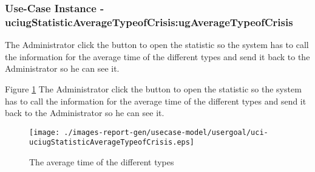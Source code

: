 
	\subsubsection{Use-Case Instance - uciugStatisticAverageTypeofCrisis:ugAverageTypeofCrisis}
	
	The Administrator click the button to open the statistic so the system has to call the information for the average time of the different types and send it back to the Administrator so he can see it. 		  
	\begin{operationmodel}
	
	\end{operationmodel} 

	
	Figure \ref{fig:lu.uni.lassy.excalibur.examples.icrash-RE-UC-uci-uciugStatisticAverageTypeofCrisis}
	The Administrator click the button to open the statistic so the system has to call the information for the average time of the different types and send it back to the Administrator so he can see it. 
	
	\begin{figure}[htbp]
	\begin{center}
	
	\texttt{[image: ./images-report-gen/usecase-model/usergoal/uci-uciugStatisticAverageTypeofCrisis.eps]}
	\end{center}
	\caption[lu.uni.lassy.excalibur.examples.icrash Sequence Diagram: uci-uciugStatisticAverageTypeofCrisis]{The average time of the different types}
	\label{fig:lu.uni.lassy.excalibur.examples.icrash-RE-UC-uci-uciugStatisticAverageTypeofCrisis}
	\end{figure}
	\vspace{0.5cm}
